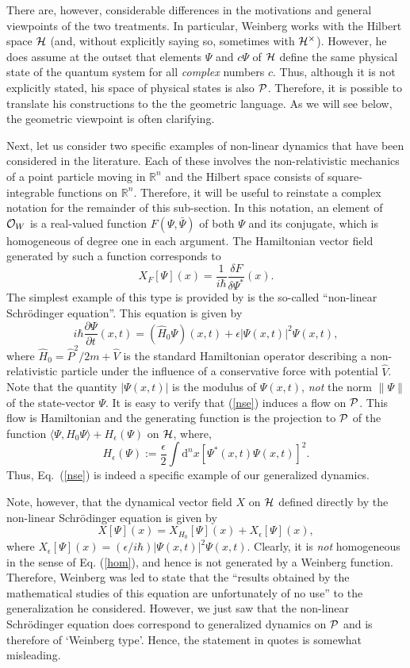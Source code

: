 \documentclass[12pt,aps,eqsecnum,tighten,nofootinbib]{revtex4-2}
\def\be{\begin{equation}}
\def\ee{\end{equation}}
\def\<{\langle}
\def\>{\rangle}
\def\d{{\mathrm d}}
\def\i{{i}}
\def\H{{\cal H}}
\def\punctH{{\cal H}^{\times}}
\def\P{{\cal P}}
\newcommand{\hvf}[1]{{X_{#1}}}
\def\R{\mathbb R}
\begin{document}
There are, however, considerable differences in the motivations and
general viewpoints of the two treatments. In particular, Weinberg
works with the Hilbert space $\H$ (and, without explicitly saying so,
sometimes with $\punctH$). However, he does assume at the outset that
elements $\Psi$ and $c\Psi$ of $\H$ define the same physical state of
the quantum system for all {\it complex} numbers $c$. Thus, although
it is not explicitly stated, his space of physical states is also
$\P$.  Therefore, it is possible to translate his constructions to the
the geometric language. As we will see below, the geometric viewpoint
is often clarifying.

Next, let us consider two specific examples of non-linear dynamics
that have been considered in the literature.  Each of these involves
the non-relativistic mechanics of a point particle moving in $\R^n$
and the Hilbert space consists of square-integrable functions on
$\R^n$. Therefore, it will be useful to reinstate a complex notation
for the remainder of this sub-section.  In this notation, an element
of ${\cal O}_W$ is a real-valued function $F(\Psi, \bar{\Psi})$ of
both $\Psi$ and its conjugate, which is homogeneous of degree one in
each argument. The Hamiltonian vector field generated by such a
function corresponds to
%
\be 
\hvf{F}[\Psi](x) = \frac{1}{\i\hbar} \frac{\delta
F}{\delta \Psi^*} ( x ).  
\ee
%
The simplest example of this type is provided by is the so-called
``non-linear Schr\"odinger equation''.  This equation is given by
%
\be \label{nse}
\i\hbar \frac{\partial \Psi}{\partial t}(x,t) = 
(\hat{H}_0 \Psi)(x,t) + \epsilon | \Psi(x,t) |^2 \Psi(x,t),
\ee
%
where $\hat{H}_0 = \hat{P}^2/2m + \hat{V}$ is the standard Hamiltonian
operator describing a non-relativistic particle under the influence of
a conservative force with potential $\hat{V}$.  Note that the quantity
$| \Psi(x,t) | $ is the modulus of $\Psi(x,t)$, {\em not} the norm
$\|\Psi\|$ of the state-vector $\Psi$. It is easy to verify that
(\ref{nse}) induces a flow on $\P$. This flow is Hamiltonian and the
generating function is the projection to $\P$ of the function
$\<\Psi, H_0\Psi\> + H_\epsilon(\Psi)$ on $\H$, where,
%
\be
 H_\epsilon(\Psi) := \frac{\epsilon}{2}\int \d^n \! x
\left[ \Psi^*(x,t) \Psi(x,t) \right]^2.
\ee
%
Thus, Eq.~(\ref{nse}) is indeed a specific example of our generalized
dynamics.

Note, however, that the dynamical vector field $X$ on $\H$ defined
directly by the non-linear Schr\"odinger equation is given by
%
\be X[\Psi](x) = \hvf{H_0}[\Psi](x) + X_\epsilon[\Psi](x), 
\ee 
%
where $X_\epsilon[\Psi](x) = (\epsilon/\i\hbar) |\Psi(x,t)|^2
\Psi(x,t)$. Clearly, it is {\it not} homogeneous in the sense of
Eq. (\ref{hom}), and hence is not generated by a Weinberg function.
Therefore, Weinberg was led to state that the ``results obtained by
the mathematical studies of this equation are unfortunately of no
use'' to the generalization he considered. However, we just saw that
the non-linear Schr\"odinger equation does correspond to generalized
dynamics on $\P$ and is therefore of `Weinberg type'. Hence, the
statement in quotes is somewhat misleading.
\end{document}
